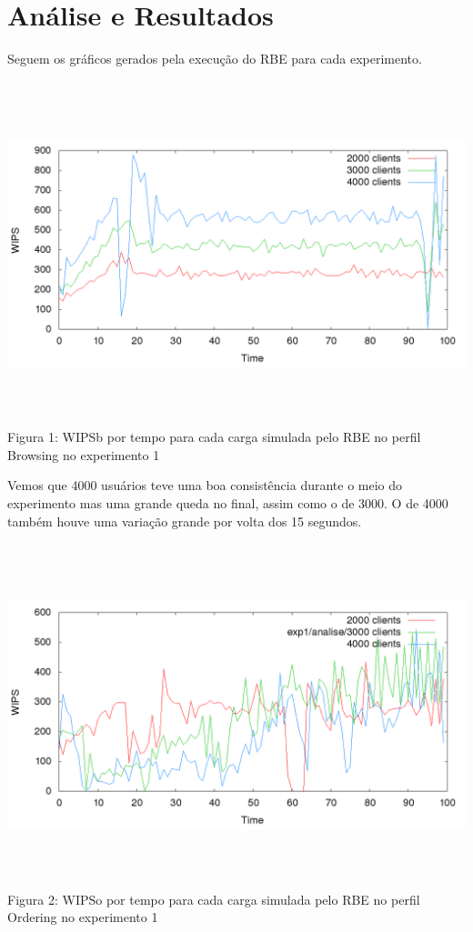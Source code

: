 \documentclass[11pt,twoside]{article}
\begin{document}
\section{An\'alise e Resultados}
\setlength{\parindent}{4ex}

Seguem os gráficos gerados pela execução do RBE para cada experimento.
\begin{center}
\includegraphics[width=15cm, height=10cm]{images/exp1/plot_browsin}
Figura 1: WIPSb por tempo para cada carga simulada pelo RBE no perfil Browsing no experimento 1
\end{center}
Vemos que 4000 usuários teve uma boa consistência durante o meio do experimento mas uma grande queda no final, assim como o de 3000. O de 4000 também houve uma variação grande por volta dos 15 segundos.
\begin{center}
\includegraphics[width=15cm, height=10cm]{images/exp1/plot_ordering}
Figura 2: WIPSo por tempo para cada carga simulada pelo RBE no perfil Ordering no experimento 1
\end{center}
\end{document}
